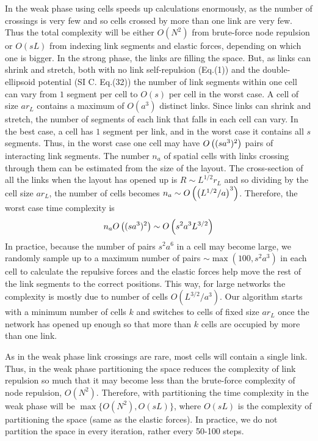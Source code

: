 \documentclass[11pt]{article}
\begin{document}
In the weak phase using cells speeds up calculations enormously, as the number of crossings is very few and so cells crossed by more than one link are very few. 
Thus the total complexity will be either $O(N^2)$ from brute-force node repulsion or $O(sL)$ from indexing link segments and elastic forces, depending on which one is bigger.
In the strong phase, the links are filling the space.
But, as links can shrink and stretch, both with no link self-repulsion (Eq.(1)) and the double-ellipsoid potential (SI C. Eq.(32)) the number of link segments within one cell can vary from $1$ segment per cell to $O(s)$ per cell in the worst case.
A cell of size $ar_L$ contains a maximum of $O(a^3)$ distinct links. 
Since links can shrink and stretch, the number of segments of each link that falls in each cell can vary. 
In the best case, a cell has $1$ segment per link, and in the worst case it contains all $s$ segments.
Thus, in the worst case one cell may have $O\left((sa^3)^2\right)$ pairs of interacting link segments. 
The number $n_a$ of spatial cells with links crossing through them can be estimated from the size of the layout. 
The cross-section of all the links when the layout has opened up is $R\sim L^{1/2} r_L$ and so dividing by the cell size $ar_L$, the number of cells becomes $n_a \sim O\left(\left(L^{1/2}/a\right)^3\right)$. 
Therefore, the worst case time complexity is 
\[n_a O\left((sa^3)^2\right) \sim  O\left({ s^2 a^3  L^{3/2} } \right) \]
In practice, because the number of pairs $s^2 a^6$ in a cell may become large, we randomly sample up to a maximum number of pairs $\sim \max (100, s^2 a^3)$ in each cell to calculate the repulsive forces and the elastic forces help move the rest of the link segments to the correct positions. 
This way, for large networks the complexity is mostly due to number of cells $O(L^{3/2}/a^3)$.
Our algorithm starts with a minimum number of cells $k$ and switches to cells of fixed size $ar_L$ once the network has opened up enough so that more than $k$ cells are occupied by more than one link. 

As in the weak phase link crossings are rare, most cells will contain a single link.
Thus, in the weak phase partitioning the space reduces the complexity of link repulsion so much that it may become less than the brute-force complexity of node repulsion, $O(N^2)$.
Therefore,  with partitioning the time complexity in the weak phase will be $\max\{O(N^2),O(sL)\}$, where $O(sL)$ is the complexity of partitioning the space (same as the elastic forces).
In practice, we do not partition the space in every iteration, rather every 50-100 steps. 
\end{document}

